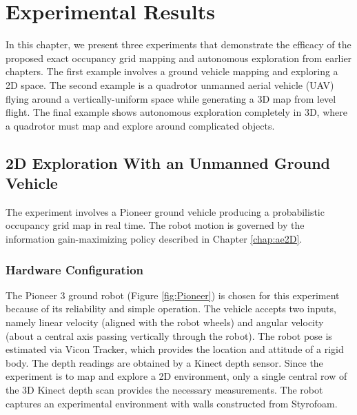 
\chapter{Experimental Results}\label{chap:Experiments}

In this chapter, we present three experiments that demonstrate the efficacy of the proposed exact occupancy grid mapping and autonomous exploration from earlier chapters. The first example involves a ground vehicle mapping and exploring a 2D space. The second example is a quadrotor unmanned aerial vehicle (UAV) flying around a vertically-uniform space while generating a 3D map from level flight. The final example shows autonomous exploration completely in 3D, where a quadrotor must map and explore around complicated objects.

\section{2D Exploration With an Unmanned Ground Vehicle}
\label{sec:PioneerNRL}

The experiment involves a Pioneer ground vehicle producing a probabilistic occupancy grid map in real time. The robot motion is governed by the information gain-maximizing policy described in Chapter \ref{chap:ae2D}.


\subsection{Hardware Configuration}
The Pioneer 3 ground robot (Figure \ref{fig:Pioneer}) is chosen for this experiment because of its reliability and simple operation. The vehicle accepts two inputs, namely linear velocity (aligned with the robot wheels) and angular velocity (about a central axis passing vertically through the robot). The robot pose is estimated via Vicon Tracker, which provides the location and attitude of a rigid body. The depth readings are obtained by a Kinect depth sensor. Since the experiment is to map and explore a 2D environment, only a single central row of the 3D Kinect depth scan provides the necessary measurements. The robot captures an experimental environment with walls constructed from Styrofoam.

